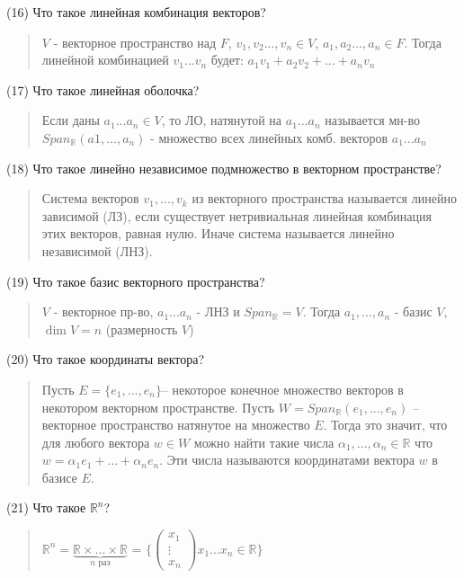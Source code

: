\documentclass{article}
\begin{document}
(16) Что такое линейная комбинация векторов? 
\begin{quote}
   $V$ - векторное пространство над $F$, $v_1, v_2 ... , v_n \in V$, $a_1, a_2 ... , a_n \in F$. Тогда линейной комбинацией $v_1 ... v_n$ будет: $a_1 v_1 + a_2 v_2 + ... + a_n v_n$
\end{quote}

(17) Что такое линейная оболочка?
\begin{quote}
   Если даны $a_1  ...  a_n \in V$, то ЛО, натянутой на $a_1 ... a_n$ называется мн-во $Span_\mathbb{R} (a1, ... , a_n)$ - множество всех линейных комб. векторов $a_1 ... a_n$
\end{quote}

(18) Что такое линейно независимое подмножество в векторном пространстве? 
\begin{quote}
    Система векторов ${v_1,...,v_k}$ из векторного пространства называется линейно зависимой (ЛЗ), если существует нетривиальная линейная комбинация этих векторов, равная нулю. Иначе система называется линейно независимой (ЛНЗ). 
\end{quote}

(19) Что такое базис векторного пространства? 
\begin{quote}
    $V$ - векторное пр-во, $a_1 ... a_n$ - ЛНЗ и $Span_\mathbb{R} = V$.
    Тогда ${a_1 , ... , a_n}$ - базис $V$, $\dim V = n$ (размерность $V$)
\end{quote}

(20) Что такое координаты вектора? 
\begin{quote}
   Пусть $E = \{e_1, . . . , e_n \}$– некоторое конечное множество векторов в некотором векторном пространстве. Пусть $W = Span_\mathbb{R} (e_1, . . . , e_n)$ – векторное пространство натянутое
на множество $E$. Тогда это значит, что для любого вектора $w \in W$ можно найти такие
числа $\alpha_1, . . . , \alpha_n \in \mathbb{R}$ что
$w = \alpha_1 e_1 + ... + \alpha_n e_n$.
Эти числа называются координатами вектора $w$ в базисе $E$.
\end{quote}

(21) Что такое $\mathbb{R}^n$? 
\begin{quote}
    $\mathbb{R}^n = \underbrace{\mathbb{R} \times ... \times \mathbb{R}}_{\text{$n$ раз}} $ = $\{ \begin{pmatrix} x_1 \\ \vdots \\ x_n\end{pmatrix} x_1 ... x_n \in \mathbb{R}\}$
\end{quote}
\end{document}
